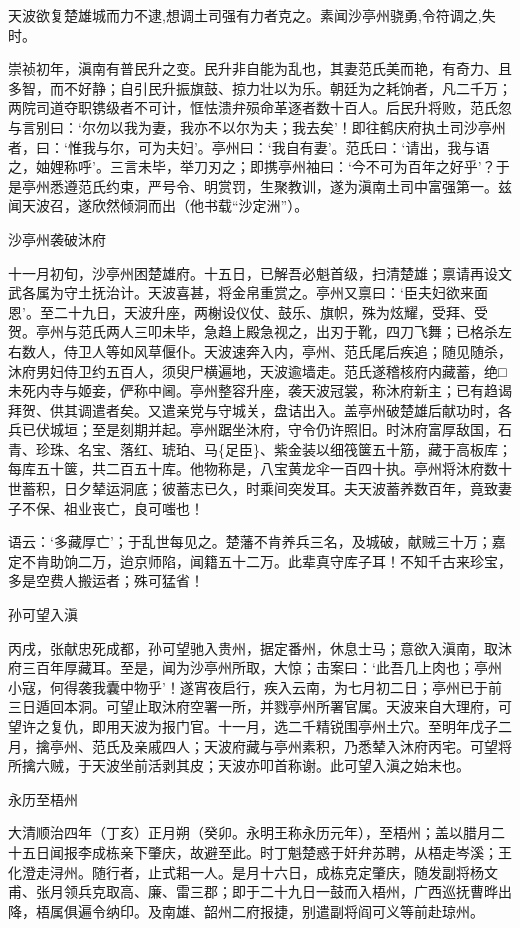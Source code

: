 \documentclass[]{article}
\begin{document}
天波欲复楚雄城而力不逮,想调土司强有力者克之。素闻沙亭州骁勇,令符调之,失时。

崇祯初年，滇南有普民升之变。民升非自能为乱也，其妻范氏美而艳，有奇力、且多智，而不好静；自引民升振旗鼓、掠力壮以为乐。朝廷为之耗饷者，凡二千万；两院司道夺职镌级者不可计，恇怯溃弁殒命革逐者数十百人。后民升将败，范氏忽与言别曰：`尔勿以我为妻，我亦不以尔为夫；我去矣'！即往鹤庆府执土司沙亭州者，曰：`惟我与尔，可为夫妇'。亭州曰：`我自有妻'。范氏曰：`请出，我与语之，妯娌称呼'。三言未毕，举刀刃之；即携亭州袖曰：`今不可为百年之好乎'？于是亭州悉遵范氏约束，严号令、明赏罚，生聚教训，遂为滇南土司中富强第一。兹闻天波召，遂欣然倾洞而出（他书载``沙定洲''）。

沙亭州袭破沐府

十一月初旬，沙亭州困楚雄府。十五日，已解吾必魁首级，扫清楚雄；禀请再设文武各属为守土抚治计。天波喜甚，将金帛重赏之。亭州又禀曰：`臣夫妇欲来面恩'。至二十九日，天波升座，两榭设仪仗、鼓乐、旗帜，殊为炫耀，受拜、受贺。亭州与范氏两人三叩未毕，急趋上殿急视之，出刃于靴，四刀飞舞；已格杀左右数人，侍卫人等如风草偃仆。天波速奔入内，亭州、范氏尾后疾追；随见随杀，沐府男妇侍卫约五百人，须臾尸横遍地，天波逾墙走。范氏遂稽核府内藏蓄，绝□未死内寺与姬妾，俨称中阃。亭州整容升座，袭天波冠裳，称沐府新主；已有趋谒拜贺、供其调遣者矣。又遣亲党与守城关，盘诘出入。盖亭州破楚雄后献功时，各兵已伏城垣；至是刻期并起。亭州踞坐沐府，守令仍许照旧。时沐府富厚敌国，石青、珍珠、名宝、落红、琥珀、马\{足臣\}、紫金装以细筏箧五十筋，藏于高板库；每库五十箧，共二百五十库。他物称是，八宝黄龙伞一百四十执。亭州将沐府数十世蓄积，日夕辇运洞底；彼蓄志已久，时乘间突发耳。夫天波蓄养数百年，竟致妻子不保、祖业丧亡，良可嗤也！

语云：`多藏厚亡'；于乱世每见之。楚藩不肯养兵三名，及城破，献贼三十万；嘉定不肯助饷二万，迨京师陷，闻籍五十二万。此辈真守库子耳！不知千古来珍宝，多是空费人搬运者；殊可猛省！

孙可望入滇

丙戌，张献忠死成都，孙可望驰入贵州，据定番州，休息士马；意欲入滇南，取沐府三百年厚藏耳。至是，闻为沙亭州所取，大惊；击案曰：`此吾几上肉也；亭州小寇，何得袭我囊中物乎'！遂宵夜启行，疾入云南，为七月初二日；亭州已于前三日遁回本洞。可望止取沐府空署一所，并戮亭州所署官属。天波来自大理府，可望许之复仇，即用天波为报门官。十一月，选二千精锐围亭州土穴。至明年戊子二月，擒亭州、范氏及亲戚四人；天波府藏与亭州素积，乃悉辇入沐府丙宅。可望将所擒六贼，于天波坐前活剥其皮；天波亦叩首称谢。此可望入滇之始末也。

永历至梧州

大清顺治四年（丁亥）正月朔（癸卯。永明王称永历元年），至梧州；盖以腊月二十五日闻报李成栋亲下肇庆，故避至此。时丁魁楚惑于奸弁苏聘，从梧走岑溪；王化澄走浔州。随行者，止式耜一人。是月十六日，成栋克定肇庆，随发副将杨文甫、张月领兵克取高、廉、雷三郡；即于二十九日一鼓而入梧州，广西巡抚曹晔出降，梧属俱遍令纳印。及南雄、韶州二府报捷，别遣副将阎可义等前赴琼州。
\end{document}
